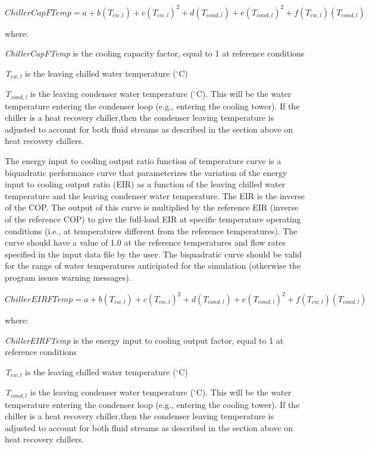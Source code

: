 \begin{equation}
ChillerCapFTemp = a + b({T_{cw,l}}) + c{({T_{cw,l}})^2} + d({T_{cond,l}}) + e{({T_{cond,l}})^2} + f({T_{cw,l}})({T_{cond,l}})
\end{equation}

where:

\emph{ChillerCapFTemp} is the cooling capacity factor, equal to 1 at reference conditions

\emph{T\(_{cw,l}\)} is the leaving chilled water temperature (\(^{\circ}\)C)

\emph{T\(_{cond,l}\)} is the leaving condenser water temperature (\(^{\circ}\)C). This will be the water temperature entering the condenser loop (e.g., entering the cooling tower). If the chiller is a heat recovery chiller,then the condenser leaving temperature is adjusted to account for both fluid streams as described in the section above on heat recovery chillers.

The energy input to cooling output ratio function of temperature curve is a biquadratic performance curve that parameterizes the variation of the energy input to cooling output ratio (EIR) as a function of the leaving chilled water temperature and the leaving condenser water temperature. The EIR is the inverse of the COP. The output of this curve is multiplied by the reference EIR (inverse of the reference COP) to give the full-load EIR at specific temperature operating conditions (i.e., at temperatures different from the reference temperatures). The curve should have a value of 1.0 at the reference temperatures and flow rates specified in the input data file by the user. The biquadratic curve should be valid for the range of water temperatures anticipated for the simulation (otherwise the program issues warning messages).

\begin{equation}
ChillerEIRFTemp = a + b({T_{cw,l}}) + c{({T_{cw,l}})^2} + d({T_{cond,l}}) + e{({T_{cond,l}})^2} + f({T_{cw,l}})({T_{cond,l}})
\end{equation}

where:

\emph{ChillerEIRFTemp} is the energy input to cooling output factor, equal to 1 at reference conditions

\emph{T\(_{cw,l}\)} is the leaving chilled water temperature (\(^{\circ}\)C)

\emph{T\(_{cond,l}\)} is the leaving condenser water temperature (\(^{\circ}\)C). This will be the water temperature entering the condenser loop (e.g., entering the cooling tower). If the chiller is a heat recovery chiller,then the condenser leaving temperature is adjusted to account for both fluid streams as described in the section above on heat recovery chillers.

